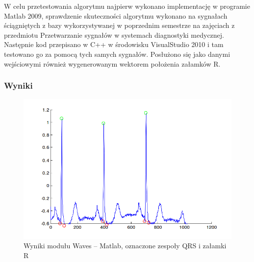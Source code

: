 \documentclass[a4paper, 11pt]{article}
\begin{document}
W celu przetestowania algorytmu najpierw wykonano implementację w programie Matlab 2009, sprawdzenie skuteczności algorytmu wykonano na sygnałach ściągniętych z bazy wykorzystywanej w poprzednim semestrze na zajęciach z przedmiotu Przetwarzanie sygnałów w systemach diagnostyki medycznej. 
Następnie kod przepisano w C++ w środowisku VisualStudio 2010 i tam testowano go za pomocą tych samych sygnałów. Posłużono się jako danymi wejściowymi również wygenerowanym wektorem położenia załamków R.

\subsubsection{Wyniki}
\label{sec:waves:results}
\begin{center}
%
\begin{figure}
\begin{centering}
\includegraphics[scale=0.4]{include/waves_matlab}
\par\end{centering}

\caption{Wyniki modułu Waves -- Matlab, oznaczone zespoły QRS i załamki R}
\label{fig:waves_matlab}
\end{figure}

\par\end{center}
\end{document}
